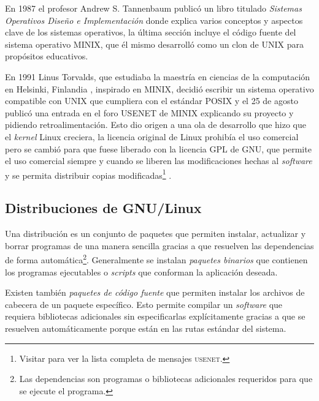 En 1987 el profesor Andrew S. Tannenbaum public\'{o} un libro titulado \textit{Sistemas Operativos Dise\~{n}o e Implementaci\'{o}n} \cite{tanenbaum_operating_2006} donde explica varios conceptos y aspectos clave de los sistemas operativos, la \'{u}ltima secci\'{o}n incluye el c\'{o}digo fuente del sistema operativo \textsc{MINIX}, que \'{e}l mismo desarroll\'{o} como un clon de \textsc{UNIX} para prop\'{o}sitos educativos\cite{_complete_????}.

En 1991 Linus Torvalds, que estudiaba la maestr\'{i}a en ciencias de la computaci\'{o}n en Helsinki, Finlandia \cite{_staff_????}, inspirado en \textsc{MINIX}, decidi\'{o} escribir un sistema operativo compatible con UNIX que cumpliera con el est\'{a}ndar \textsc{POSIX} y el 25 de agosto public\'{o} una entrada en el foro \textsc{USENET} de \textsc{MINIX} \cite{_history_????} explicando su proyecto y pidiendo retroalimentaci\'{o}n. Esto dio origen a una ola de desarrollo que hizo que el \textit{kernel} Linux creciera, la licencia original de Linux prohib\'{i}a el uso comercial pero se cambi\'{o} para que fuese liberado con la licencia \textsc{GPL} de \textsc{GNU}, que permite el uso comercial siempre y cuando se liberen las modificaciones hechas al \textit{software} y se permita distribuir copias modificadas\footnote{Visitar \cite{_linuxs_????} para ver la lista completa de mensajes \textsc{usenet}.} \cite{_linux_????-3}.

  \subsection {Distribuciones de GNU/Linux}

Una distribuci\'{o}n es un conjunto de paquetes que permiten instalar, actualizar y borrar programas de una manera sencilla gracias a que resuelven las dependencias de forma autom\'{a}tica\footnote{Las dependencias son programas o bibliotecas adicionales requeridos para que se ejecute el programa.}. Generalmente se instalan \textit{paquetes binarios} que contienen los programas ejecutables o \textit{scripts} que conforman la aplicaci\'{o}n deseada.

Existen tambi\'{e}n \textit{paquetes de c\'{o}digo fuente} que permiten instalar los archivos de cabecera de un paquete espec\'{i}fico. Esto permite compilar un \textit{software} que requiera bibliotecas adicionales sin especificarlas expl\'{i}citamente gracias a que se resuelven autom\'{a}ticamente porque est\'{a}n en las rutas est\'{a}ndar del sistema.

